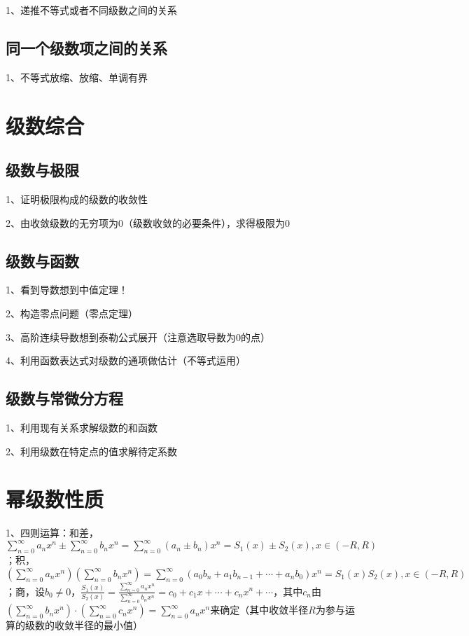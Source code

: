 1、递推不等式或者不同级数之间的关系



\subsection{同一个级数项之间的关系}

1、不等式放缩、放缩、单调有界

\section{级数综合}



\subsection{级数与极限}

1、证明极限构成的级数的收敛性

2、由收敛级数的无穷项为0（级数收敛的必要条件），求得极限为0



\subsection{级数与函数}

1、看到导数想到中值定理！

2、构造零点问题（零点定理）

3、高阶连续导数想到泰勒公式展开（注意选取导数为0的点）

4、利用函数表达式对级数的通项做估计（不等式运用）



\subsection{级数与常微分方程}

1、利用现有关系求解级数的和函数

2、利用级数在特定点的值求解待定系数

\section{幂级数性质}

1、四则运算：和差，$\sum_{n=0}^{\infty} a_{n} x^{n} \pm \sum_{n=0}^{\infty} b_{n} x^{n}=\sum_{n=0}^{\infty}\left(a_{n} \pm b_{n}\right) x^{n}=S_{1}(x) \pm S_{2}(x), x \in(-R, R)$；积，$\left(\sum_{n=0}^{\infty} a_{n} x^{n}\right)\left(\sum_{n=0}^{\infty} b_{n} x^{n}\right)=\sum_{n=0}^{\infty}\left(a_{0} b_{n}+a_{1} b_{n-1}+\cdots+a_{n} b_{0}\right) x^{n}=S_{1}(x) S_{2}(x), x \in(-R, R) $；商，设$b_0 \ne 0$，$\frac{S_{1}(x)}{S_{2}(x)}=\frac{\sum_{n=0}^{\infty} a_{n} x^{n}}{\sum_{n=0}^{\infty} b_{n} x^{n}}=c_{0}+c_{1} x+\cdots+c_{n} x^{n}+\cdots$，其中$c_{n}$由$\left(\sum_{n=0}^{\infty} b_{n} x^{n}\right) \cdot\left(\sum_{n=0}^{\infty} c_{n} x^{n}\right)=\sum_{n=0}^{\infty} a_{n} x^{n}$来确定（其中收敛半径$R$为参与运算的级数的收敛半径的最小值）

